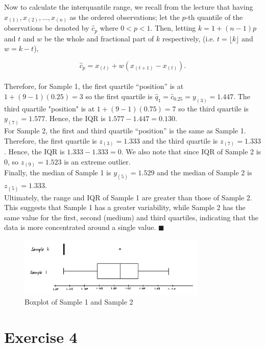 \documentclass{article}
\begin{document}
Now to calculate the interquantile range, we recall from the lecture that having $x_{(1)}, x_{(2)}, \dots, x_{(n)}$ as the ordered observations; let the $p$-th quantile of the observations be denoted by $\hat{c}_p$ where $0 < p < 1$. Then, letting $k = 1 + (n-1)p$ and $t$ and $w$ be the whole and fractional part of $k$ respectively, (i.e. $t = \lfloor k \rfloor$ and $w = k - t$),

$$
\hat{c}_p = x_{(t)} + w(x_{(t+1)} - x_{(t)}).
$$
\\
Therefore, for Sample 1, the first quartile ``position'' is at $1 + (9-1)(0.25) = 3$ so the first quartile is $\hat{q}_1 = \hat{c}_{0.25} = y_{(3)} = 1.447$. The third quartile "position" is at $1 + (9-1)(0.75) = 7$ so the third quartile is $y_{(7)} = 1.577$. Hence, the IQR is $1.577 - 1.447 = 0.130$. \\

For Sample 2, the first and third quartile ``position'' is the same as Sample 1. Therefore, the first quartile is $z_{(3)} = 1.333$ and the third quartile is $z_{(7)} = 1.333$. Hence, the IQR is $1.333 - 1.333 = 0$. We also note that since IQR of Sample 2 is 0, so $z_{(9)} = 1.523$ is an extreme outlier. \\

Finally, the median of Sample 1 is $y_{(5)} = 1.529$ and the median of Sample 2 is $z_{(5)} = 1.333$. \\

Ultimately, the range and IQR of Sample 1 are greater than those of Sample 2. This suggests that Sample 1 has a greater variability, while Sample 2 has the same value for the first, second (medium) and third quartiles, indicating that the data is more concentrated around a single value. $\blacksquare$

\begin{figure}[h!]
    \centering
    \includegraphics[width=0.8\textwidth]{images/boxplot.jpg}
    \caption{Boxplot of Sample 1 and Sample 2}
    \label{fig:boxplot}
\end{figure}

\newpage
\section*{Exercise 4}
\end{document}
